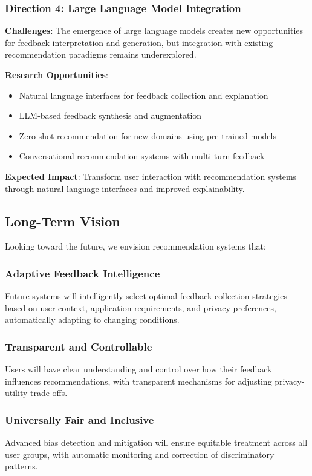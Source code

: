 \subsubsection{Direction 4: Large Language Model Integration}

\textbf{Challenges}:
The emergence of large language models creates new opportunities for feedback interpretation and generation, but integration with existing recommendation paradigms remains underexplored.

\textbf{Research Opportunities}:
\begin{itemize}
    \item Natural language interfaces for feedback collection and explanation
    \item LLM-based feedback synthesis and augmentation
    \item Zero-shot recommendation for new domains using pre-trained models
    \item Conversational recommendation systems with multi-turn feedback
\end{itemize}

\textbf{Expected Impact}: Transform user interaction with recommendation systems through natural language interfaces and improved explainability.

\subsection{Long-Term Vision}

Looking toward the future, we envision recommendation systems that:

\subsubsection{Adaptive Feedback Intelligence}
Future systems will intelligently select optimal feedback collection strategies based on user context, application requirements, and privacy preferences, automatically adapting to changing conditions.

\subsubsection{Transparent and Controllable}
Users will have clear understanding and control over how their feedback influences recommendations, with transparent mechanisms for adjusting privacy-utility trade-offs.

\subsubsection{Universally Fair and Inclusive}
Advanced bias detection and mitigation will ensure equitable treatment across all user groups, with automatic monitoring and correction of discriminatory patterns.

